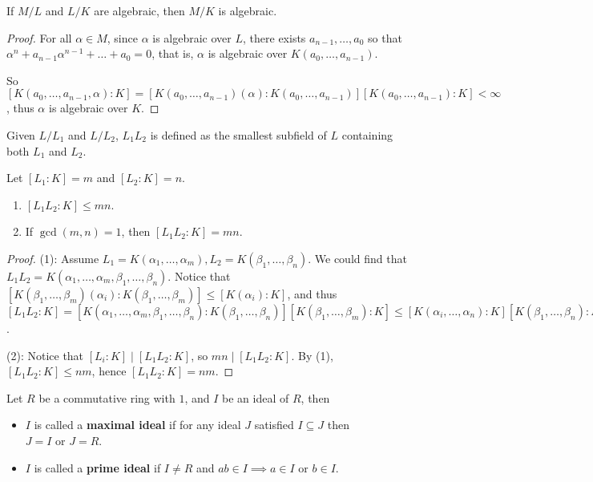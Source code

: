 \begin{prop} \label{prop:alg-tower-implies-alg}
  If $M/L$ and $L/K$ are algebraic, then $M/K$ is algebraic.

  \begin{proof}
    For all $\alpha \in M$, since $\alpha$ is algebraic over $L$,
    there exists $a_{n-1}, \dots, a_0$ so that $\alpha^n + a_{n-1} \alpha^{n-1} + \dots + a_0 = 0$,
    that is, $\alpha$ is algebraic over $K(a_0, \dots, a_{n-1})$.

    So $[K(a_0, \dots, a_{n-1}, \alpha): K] = [K(a_0, \dots, a_{n-1})(\alpha): K(a_0, \dots, a_{n-1})]
    [K(a_0, \dots, a_{n-1}): K] < \infty$, thus $\alpha$ is algebraic over $K$.
  \end{proof}
\end{prop}

\begin{definition}
  Given $L/L_1$ and $L/L_2$, $L_1 L_2$ is defined as the smallest subfield of $L$
  containing both $L_1$ and $L_2$.
\end{definition}

\begin{prop}
  Let $[L_1: K] = m$ and $[L_2: K] = n$.
  \begin{enumerate}[(\arabic*)]
    \item $[L_1 L_2: K] \leq mn$.
    \item If $\gcd(m, n) = 1$, then $[L_1 L_2: K] = mn$.
  \end{enumerate}

  \begin{proof}
    (1): Assume $L_1 = K(\alpha_1, \dots, \alpha_m), L_2 = K(\beta_1, \dots, \beta_n)$.
    We could find that $L_1 L_2 = K(\alpha_1, \dots, \alpha_m, \beta_1, \dots, \beta_n)$.
    Notice that $[K(\beta_1, \dots, \beta_m)(\alpha_i): K(\beta_1, \dots, \beta_m)] \leq [K(\alpha_i): K]$,
    and thus $[L_1 L_2: K] = [K(\alpha_1, \dots, \alpha_m, \beta_1, \dots, \beta_n)
    : K(\beta_1, \dots, \beta_n)] [K(\beta_1, \dots, \beta_m): K] \leq [K(\alpha_i, \dots, \alpha_n): K]
    [K(\beta_1, \dots, \beta_n): K] = [L_1: K][L_2: K]$.

    (2): Notice that $[L_i: K] \mid [L_1 L_2: K]$, so $mn \mid [L_1 L_2: K]$. By
    (1), $[L_1 L_2: K] \leq nm$, hence $[L_1 L_2: K] = nm$.
  \end{proof}
\end{prop}

\begin{definition}
  Let $R$ be a commutative ring with $1$, and $I$ be an ideal of $R$, then
  \begin{itemize}
    \item $I$ is called a {\bf maximal ideal} if for any ideal $J$ satisfied
      $I \subseteq J$ then $J = I \text{ or } J = R$.
    \item $I$ is called a {\bf prime ideal}
      if $I \neq R$ and $ab \in I \implies a \in I \text{ or } b \in I$.
  \end{itemize}
\end{definition}


